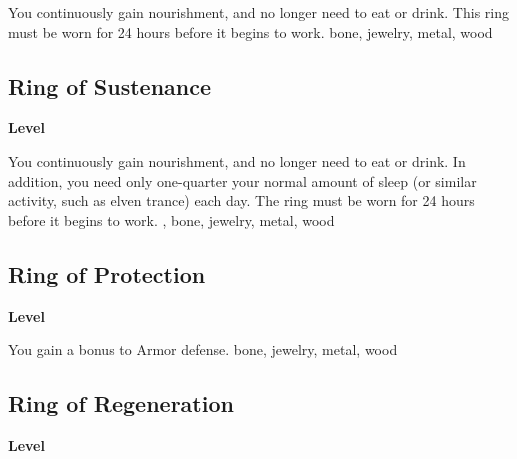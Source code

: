 \vspace{-1.5em}  %
You continuously gain nourishment, and no longer need to eat or drink.
This ring must be worn for 24 hours before it begins to work.
 
 bone, jewelry, metal, wood
\begin{multicols}{2}
\lowercase{\hypertarget{item:Ring of Sustenance}{}}\label{item:Ring of Sustenance}
\hypertarget{item:Ring of Sustenance}{\subsection{Ring of Sustenance}}
\columnbreak%
\begin{flushright}
\large\textbf{ Level}
\end{flushright}
\end{multicols}
\vspace{-1.5em}  %
You continuously gain nourishment, and no longer need to eat or drink.
In addition, you need only one-quarter your normal amount of sleep (or similar activity, such as elven trance) each day.
The ring must be worn for 24 hours before it begins to work.
 , 
 bone, jewelry, metal, wood
\begin{multicols}{2}
\lowercase{\hypertarget{item:Ring of Protection}{}}\label{item:Ring of Protection}
\hypertarget{item:Ring of Protection}{\subsection{Ring of Protection}}
\columnbreak%
\begin{flushright}
\large\textbf{ Level}
\end{flushright}
\end{multicols}
\vspace{-1.5em}  %
You gain a  bonus to Armor defense.
 
 bone, jewelry, metal, wood
\begin{multicols}{2}
\lowercase{\hypertarget{item:Ring of Regeneration}{}}\label{item:Ring of Regeneration}
\hypertarget{item:Ring of Regeneration}{\subsection{Ring of Regeneration}}
\columnbreak%
\begin{flushright}
\large\textbf{ Level}
\end{flushright}
\end{multicols}
